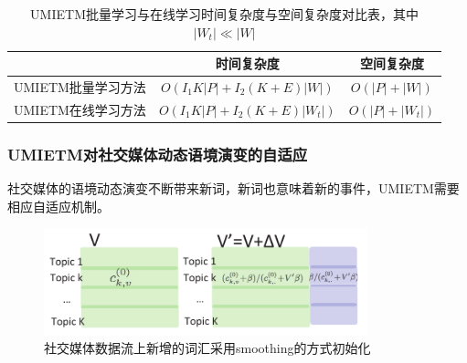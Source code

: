 \begin{frame}
\vspace{-1mm}

\begin{table}[ht]
	\setlength{\abovecaptionskip}{0.cm}
	\setlength{\belowcaptionskip}{0.cm}
	\caption{UMIETM批量学习与在线学习时间复杂度与空间复杂度对比表，其中\(|W_t| \ll |W|\)}
	\begin{tabular}{|l|c|c|}
	\hline
       & 时间复杂度 & 空间复杂度 \\ \hline
	UMIETM批量学习方法  & \(O(I_1 K|P|+I_2 (K+E)|W|)\) & \(O(|P|+|W|)\) \\ \hline
	UMIETM在线学习方法 & \(O(I_1 K|P|+I_2 (K+E)|W_t|)\) & \(O(|P|+|W_t|)\) \\
	\hline
	\end{tabular}
\end{table}


\end{frame}

\begin{frame}
\frametitle{UMIETM对社交媒体动态语境演变的自适应}
社交媒体的语境动态演变不断带来新词，新词也意味着新的事件，UMIETM需要相应自适应机制。

\begin{figure}
	\centering
	\includegraphics[height=3.1cm]{img/UMIETM/stream2.pdf}
	\caption{社交媒体数据流上新增的词汇采用smoothing的方式初始化}
\end{figure}
\end{frame}

